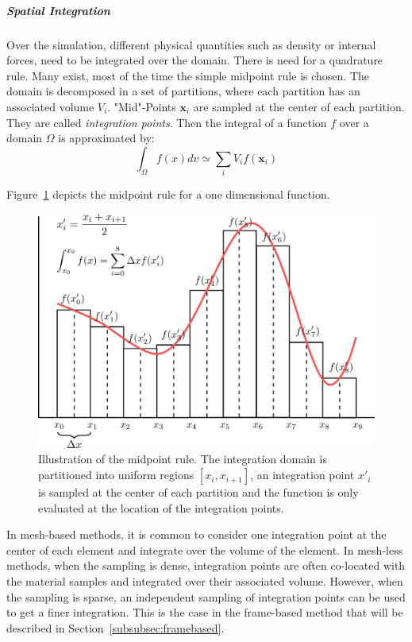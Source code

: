 \subparagraph{Spatial Integration}

Over the simulation, different physical quantities such as density or internal forces, need to be integrated over the domain. 
There is need for a quadrature rule. 
Many exist, most of the time the simple midpoint rule is chosen. 
The domain is decomposed in a set of partitions, where each partition has an associated volume $V_{i}$. 
"Mid"-Points $\mathbf{x}_{i}$ are sampled at the center of each partition.
They are called \emph{integration points}. 
Then the integral of a function $f$ over a domain $\Omega$ is approximated by:
\begin{equation}
\label{eq:midpointRule}
\int_{\Omega} f(x)dv \simeq \sum_{i} V_{i}f(\mathbf{x}_{i})
\end{equation}

Figure~\ref{fig:spatialIntegration} depicts the midpoint rule for a one dimensional function.
\begin{figure}[!ht]
	\centering
	\includegraphics[scale=1.0]{images/continuum_mechanics/spatialIntegration.png}
	\caption[STAR mechanics: Spatial integration]{\label{fig:spatialIntegration} Illustration of the midpoint rule. The integration domain is partitioned into uniform regions $\left[x_{i}, x_{i+1}\right]$, an integration point $x'_{i}$ is sampled at the center of each partition and the function is only evaluated at the location of the integration points.}
\end{figure}

In mesh-based methods, it is common to consider one integration point at the center of each element and integrate over the volume of the element.
In mesh-less methods, when the sampling is dense, integration points are often co-located with the material samples and integrated over their associated volume. 
However, when the sampling is sparse, an independent sampling of integration points can be used to get a finer integration.
This is the case in the frame-based method that will be described in Section~\ref{subsubsec:framebased}.

